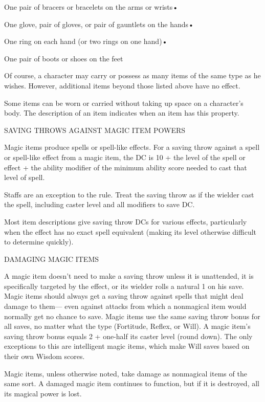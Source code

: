 \documentclass{article}
\begin{document}
One pair of bracers or bracelets on the arms or wrists• 

\parindent=7pt
One glove, pair of gloves, or pair of gauntlets on the hands• 

\parindent=3pt
One ring on each hand (or two rings on one hand)• 

One pair of boots or shoes on the feet

Of course, a character may carry or possess as many items of the same type as he 
wishes. However, additional items beyond those listed above have no effect. 

Some items\textit{ }can be worn or carried without taking up space on a character's 
body. The description of an item indicates when an item has this property.

\vspace{12pt}
\parindent=0pt
{\large{}SAVING THROWS AGAINST MAGIC ITEM POWERS}

Magic items produce spells or spell-like effects. For a saving throw against a 
spell or spell-like effect from a magic item, the DC is 10 + the level of the spell 
or effect + the ability modifier of the minimum ability score needed to cast that 
level of spell. 

Staffs are an exception to the rule. Treat the saving throw as if the wielder cast 
the spell, including caster level and all modifiers to save DC. 

Most item descriptions give saving throw DCs for various effects, particularly 
when the effect has no exact spell equivalent (making its level otherwise difficult 
to determine quickly).

\vspace{12pt}
{\large{}DAMAGING MAGIC ITEMS}

A magic item doesn't need to make a saving throw unless it is unattended, it is 
specifically targeted by the effect, or its wielder rolls a natural 1 on his save. 
Magic items should always get a saving throw against spells that might deal damage 
to them--- even against attacks from which a nonmagical item would normally get 
no chance to save. Magic items use the same saving throw bonus for all saves, no 
matter what the type (Fortitude, Reflex, or Will). A magic item's saving throw 
bonus equals 2 + one-half its caster level (round down). The only exceptions to 
this are intelligent magic items, which make Will saves based on their own Wisdom 
scores.

Magic items, unless otherwise noted, take damage as nonmagical items of the same 
sort. A damaged magic item continues to function, but if it is destroyed, all its 
magical power is lost.
\end{document}
